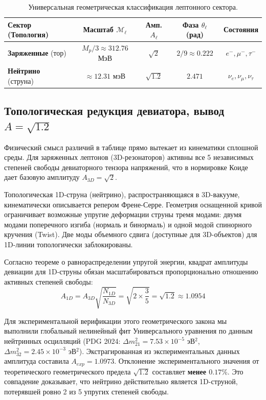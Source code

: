 \documentclass[12pt,a4paper]{article}
\begin{document}
	\begin{table}[htbp]
		\centering
		\caption{Универсальная геометрическая классификация лептонного сектора.}
		\renewcommand{\arraystretch}{1.4}
		\begin{tabular}{lcccc}
			\toprule
			\textbf{Сектор (Топология)} & \textbf{Масштаб $\mathcal{M}_\ell$} & \textbf{Амп. $A_\ell$} & \textbf{Фаза $\theta_\ell$ (рад)} & \textbf{Состояния} \\
			\midrule
			\textbf{Заряженные} (тор) & $M_p/3 \approx 312.76$ МэВ & $\sqrt{2}$ & $2/9 \approx 0.222$ & $e^-, \mu^-, \tau^-$ \\
			\textbf{Нейтрино} (струна) & $\approx 12.31$ мэВ & $\sqrt{1.2}$ & $2.471$ & $\nu_e, \nu_\mu, \nu_\tau$ \\
			\bottomrule
		\end{tabular}
		\label{tab:leptons}
	\end{table}
	
	\subsection{Топологическая редукция девиатора, вывод $A = \sqrt{1.2}$}
	Физический смысл различий в таблице прямо вытекает из кинематики сплошной среды. Для заряженных лептонов (3D-резонаторов) активны все 5 независимых степеней свободы девиаторного тензора напряжений, что в нормировке Коиде дает базовую амплитуду $A_{3D} = \sqrt{2}$.
	
	Топологическая 1D-струна (нейтрино), распространяющаяся в 3D-вакууме, кинематически описывается репером Френе-Серре. Геометрия оснащенной кривой ограничивает возможные упругие деформации струны тремя модами: двумя модами поперечного изгиба (нормаль и бинормаль) и одной модой спинорного кручения (Twist). Две моды объемного сдвига (доступные для 3D-объектов) для 1D-линии топологически заблокированы.
	
	Согласно теореме о равнораспределении упругой энергии, квадрат амплитуды девиации для 1D-струны обязан масштабироваться пропорционально отношению активных степеней свободы:
	\begin{equation}
		A_{1D} = A_{3D} \sqrt{\frac{N_{1D}}{N_{3D}}} = \sqrt{2 \times \frac{3}{5}} = \sqrt{1.2} \approx \mathbf{1.0954}
	\end{equation}
	
	Для экспериментальной верификации этого геометрического закона мы выполнили глобальный нелинейный фит Универсального уравнения по данным нейтринных осцилляций (PDG 2024: $\Delta m^2_{21} = 7.53 \times 10^{-5}$ эВ$^2$, $\Delta m^2_{32} = 2.45 \times 10^{-3}$ эВ$^2$). 
	Экстрагированная из экспериментальных данных амплитуда составила $A_{exp} = \mathbf{1.0973}$. 
	Отклонение экспериментального значения от теоретического геометрического предела $\sqrt{1.2}$ составляет \textbf{менее $0.17\%$}. Это совпадение доказывает, что нейтрино действительно является 1D-струной, потерявшей ровно 2 из 5 упругих степеней свободы.
	
\end{document}
